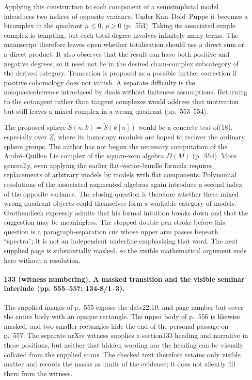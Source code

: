 Applying this construction to each component of a semisimplicial model introduces two indices of opposite variance. Under Kan--Dold--Puppe it becomes a bicomplex in the quadrant $n\leq0$, $p\geq0$ (p.~553). Taking its associated simple complex is tempting, but each total degree involves infinitely many terms. The manuscript therefore leaves open whether totalization should use a direct sum or a direct product. It also observes that the result can have both positive and negative degrees, so it need not lie in the desired chain-complex subcategory of the derived category. Truncation is proposed as a possible further correction if positive cohomology does not vanish. A separate difficulty is the nonquasicoherence introduced by duals without finiteness assumptions. Returning to the cotangent rather than tangent complexes would address that motivation but still leaves a mixed complex in a wrong quadrant (pp.~553--554).

The proposed sphere $S(n,k)=\widetilde S(k[n])$ would be a concrete test of(18), especially over $\underline Z$, where its homotopy modules are hoped to recover the ordinary sphere groups. The author has not begun the necessary computation of the Andr\'e--Quillen Lie complex of the square-zero algebra $D(M)$ (p.~554). More generally, even applying the earlier flat-vector-bundle formula requires replacements of arbitrary models by models with flat components. Polynomial resolutions of the associated augmented algebras again introduce a second index of the opposite variance. The closing question is therefore whether these mixed wrong-quadrant objects could themselves form a workable category of models. Grothendieck expressly admits that his formal intuition breaks down and that the suggestion may be meaningless. The stepped double pen stroke before this question is a paragraph-separation cue whose upper arm passes beneath ``spectra''; it is not an independent underline emphasizing that word. The next supplied page is substantially masked, so the visible mathematical argument ends here without a resolution.

\paragraph{133 (witness numbering). A masked transition and the visible seminar interlude (pp. 555--557; 134-8/1--3).}
The supplied images of p.~555 expose the date22.10. and page number but cover the entire body with an opaque rectangle. The upper body of p.~556 is likewise masked, and two smaller rectangles hide the end of the personal passage on p.~557. The separate arXiv witness supplies a section133 heading and narrative in these positions, but neither that hidden wording nor the heading can be visually collated from the supplied scans. The checked text therefore retains only visible matter and records the masks as limits of the evidence; it does not silently fill them from the witness.

